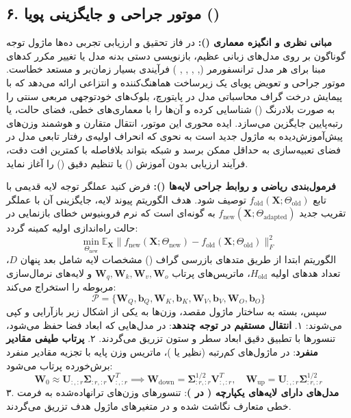 \subsection*{۶. موتور جراحی و جایگزینی پویا  ()}

\textbf{مبانی نظری و انگیزه معماری ():}
در فاز تحقیق و ارزیابی تجربی ده‌ها ماژول توجه گوناگون بر روی مدل‌های زبانی عظیم، بازنویسی دستی بدنه مدل یا تغییر مکرر کدهای مبنا برای هر مدل ترانسفورمر (, , , , ) فرآیندی بسیار زمان‌بر و مستعد خطاست. موتور جراحی و تعویض پویای  یک زیرساخت هماهنگ‌کننده و انتزاعی ارائه می‌دهد که با پیمایش درخت گراف محاسباتی مدل در پایتورچ، بلوک‌های خودتوجهی مربعی سنتی را به صورت بلادرنگ () شناسایی کرده و آن‌ها را با معماری‌های خطی، فضای حالت، یا رتبه‌پایین جایگزین می‌سازد.
ایده محوری این موتور، انتقال متقارن و هوشمند وزن‌های پیش‌آموزش‌دیده به ماژول جدید است به نحوی که انحراف اولیه‌ی رفتار تابعی مدل در فضای تعبیه‌سازی به حداقل ممکن برسد و شبکه بتواند بلافاصله با کمترین افت دقت، فرآیند ارزیابی بدون آموزش () یا تنظیم دقیق () را آغاز نماید.

\textbf{فرمول‌بندی ریاضی و روابط جراحی لایه‌ها ():}
فرض کنید عملگر توجه لایه قدیمی با تابع $f_{\text{old}}(\mathbf{X}; \Theta_{\text{old}})$ توصیف شود. هدف الگوریتم پیوند لایه، جایگزینی آن با عملگر تقریب جدید $f_{\text{new}}(\mathbf{X}; \Theta_{\text{adapted}})$ به گونه‌ای است که نرم فروبنیوس خطای بازنمایی در حالت راه‌اندازی اولیه کمینه گردد:
\begin{equation}
\min_{\Theta_{\text{new}}} \mathbb{E}_{\mathbf{X}} \|f_{\text{new}}(\mathbf{X}; \Theta_{\text{new}}) - f_{\text{old}}(\mathbf{X}; \Theta_{\text{old}})\|_F^2
\end{equation}
الگوریتم ابتدا از طریق متدهای بازرسی گراف () مشخصات لایه شامل بعد پنهان $D$، تعداد هدهای اولیه $H_{\text{old}}$، ماتریس‌های پرتاب $\mathbf{W}_q, \mathbf{W}_k, \mathbf{W}_v, \mathbf{W}_o$ و لایه‌های نرمال‌سازی مربوطه را استخراج می‌کند:
\begin{equation}
\mathcal{P} = \{\mathbf{W}_Q, \mathbf{b}_Q, \mathbf{W}_K, \mathbf{b}_K, \mathbf{W}_V, \mathbf{b}_V, \mathbf{W}_O, \mathbf{b}_O\}
\end{equation}
سپس، بسته به ساختار ماژول مقصد، وزن‌ها به یکی از اشکال زیر بازآرایی و کپی می‌شوند:
۱. \textbf{انتقال مستقیم در توجه چندهد}: در مدل‌هایی که ابعاد فضا حفظ می‌شود، تنسورها با تطبیق دقیق ابعاد سطر و ستون تزریق می‌گردند.
۲. \textbf{پرتاب طیفی مقادیر منفرد}: در ماژول‌های کم‌رتبه (نظیر  یا )، ماتریس وزن پایه با تجزیه مقادیر منفرد برش‌خورده پرتاب می‌شود:
\begin{equation}
\mathbf{W}_0 \approx \mathbf{U}_{:, :r} \mathbf{\Sigma}_{:r, :r} \mathbf{V}_{:, :r}^T \implies \mathbf{W}_{\text{down}} = \mathbf{\Sigma}_{:r, :r}^{1/2} \mathbf{V}_{:, :r}^T, \quad \mathbf{W}_{\text{up}} = \mathbf{U}_{:, :r} \mathbf{\Sigma}_{:r, :r}^{1/2}
\end{equation}
۳. \textbf{مدل‌های دارای لایه‌های یکپارچه ( در )}: تنسورهای وزن‌های ترانهاده‌شده به فرمت خطی متعارف نگاشت شده و در متغیرهای ماژول هدف تزریق می‌گردند.

